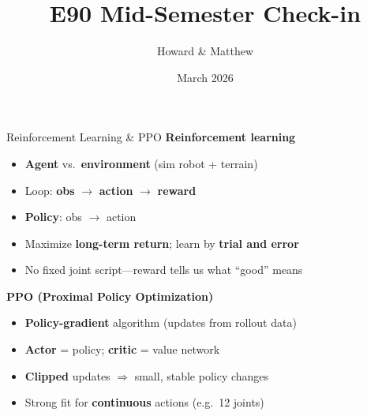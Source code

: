 \documentclass[aspectratio=169]{beamer}
\title[E90]{E90 Mid-Semester Check-in}
\author{Howard \& Matthew}
\date{March 2026}
\begin{document}
\begin{frame}{Reinforcement Learning \& PPO}
  \footnotesize
  \textbf{Reinforcement learning}
  \begin{itemize}\setlength{\itemsep}{0.15em}
    \item \textbf{Agent} vs.\ \textbf{environment} (sim robot + terrain)
    \item Loop: \textbf{obs} $\rightarrow$ \textbf{action} $\rightarrow$ \textbf{reward}
    \item \textbf{Policy}: obs $\rightarrow$ action
    \item Maximize \textbf{long-term return}; learn by \textbf{trial and error}
    \item No fixed joint script---reward tells us what ``good'' means
  \end{itemize}
  \vspace{0.35em}
  \textbf{PPO (Proximal Policy Optimization)}
  \begin{itemize}\setlength{\itemsep}{0.15em}
    \item \textbf{Policy-gradient} algorithm (updates from rollout data)
    \item \textbf{Actor} = policy; \textbf{critic} = value network
    \item \textbf{Clipped} updates $\Rightarrow$ small, stable policy changes
    \item Strong fit for \textbf{continuous} actions (e.g.\ 12 joints)
  \end{itemize}
\end{frame}
\end{document}
